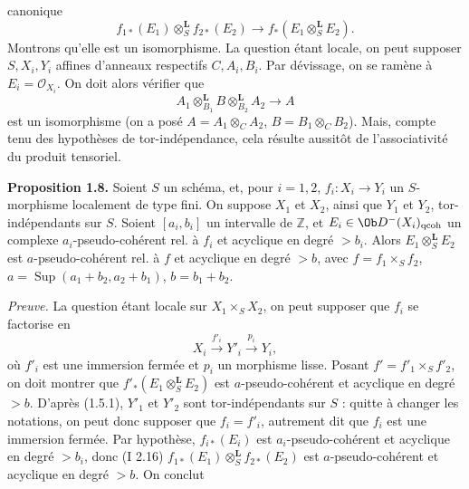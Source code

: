 canonique
\[
  f_{1*}(E_1)\otimes_S^{\mathbf L}f_{2*}(E_2)
  \longrightarrow
  f_*(E_1\otimes_S^{\mathbf L}E_2).
\]
Montrons qu'elle est un isomorphisme. La question étant locale, on peut supposer \(S,X_i,Y_i\) affines d'anneaux respectifs \(C,A_i,B_i\). Par dévissage, on se ramène à \(E_i=\mathcal O_{X_i}\). On doit alors vérifier que
\[
  A_1\otimes_{B_1}^{\mathbf L}B\otimes_{B_2}^{\mathbf L}A_2
  \longrightarrow A
\]
est un isomorphisme (on a posé \(A=A_1\otimes_C A_2\), \(B=B_1\otimes_C B_2\)). Mais, compte tenu des hypothèses de tor-indépendance, cela résulte aussitôt de l'associativité du produit tensoriel.

\textbf{Proposition 1.8.} Soient \(S\) un schéma, et, pour \(i=1,2\), \(f_i:X_i\longrightarrow Y_i\) un \(S\)-morphisme localement de type fini. On suppose \(X_1\) et \(X_2\), ainsi que \(Y_1\) et \(Y_2\), tor-indépendants sur \(S\). Soient \([a_i,b_i]\) un intervalle de \(\mathbb Z\), et \(E_i\in\Ob D^{-}(X_i)_{\mathrm{qcoh}}\) un complexe \(a_i\)-pseudo-cohérent rel. à \(f_i\) et acyclique en degré \(>b_i\). Alors \(E_1\otimes_S^{\mathbf L}E_2\) est \(a\)-pseudo-cohérent rel. à \(f\) et acyclique en degré \(>b\), avec \(f=f_1\times_Sf_2\), \(a=\operatorname{Sup}(a_1+b_2,a_2+b_1)\), \(b=b_1+b_2\).

\emph{Preuve.} La question étant locale sur \(X_1\times_SX_2\), on peut supposer que \(f_i\) se factorise en
\[
  X_i\xrightarrow{f'_i}Y'_i\xrightarrow{p_i}Y_i,
\]
où \(f'_i\) est une immersion fermée et \(p_i\) un morphisme lisse. Posant \(f'=f'_1\times_Sf'_2\), on doit montrer que \(f'_*(E_1\otimes_S^{\mathbf L}E_2)\) est \(a\)-pseudo-cohérent et acyclique en degré \(>b\). D'après (1.5.1), \(Y'_1\) et \(Y'_2\) sont tor-indépendants sur \(S\) : quitte à changer les notations, on peut donc supposer que \(f_i=f'_i\), autrement dit que \(f_i\) est une immersion fermée. Par hypothèse, \(f_{i*}(E_i)\) est \(a_i\)-pseudo-cohérent et acyclique en degré \(>b_i\), donc (I 2.16) \(f_{1*}(E_1)\otimes_S^{\mathbf L}f_{2*}(E_2)\) est \(a\)-pseudo-cohérent et acyclique en degré \(>b\). On conclut
